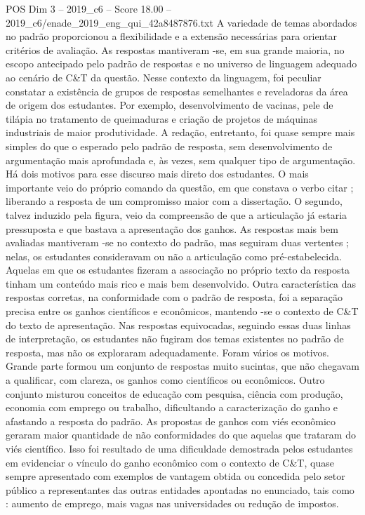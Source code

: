 \begin{textsample}{POS Dim 3 – 2019\_c6 – Score 18.00 – 2019\_c6/enade\_2019\_eng\_qui\_42a8487876.txt}
A variedade de temas abordados no padrão proporcionou a flexibilidade e a extensão necessárias para orientar critérios de avaliação.
As respostas mantiveram -se, em sua grande maioria, no escopo antecipado pelo padrão de respostas e no universo de linguagem adequado ao cenário de C\&T da questão.
Nesse contexto da linguagem, foi peculiar constatar a existência de grupos de respostas semelhantes e reveladoras da área de origem dos estudantes.
Por exemplo, desenvolvimento de vacinas, pele de tilápia no tratamento de queimaduras e criação de projetos de máquinas industriais de maior produtividade.
A redação, entretanto, foi quase sempre mais simples do que o esperado pelo padrão de resposta, sem desenvolvimento de argumentação mais aprofundada e, às vezes, sem qualquer tipo de argumentação.
Há dois motivos para esse discurso mais direto dos estudantes.
O mais importante veio do próprio comando da questão, em que constava o verbo citar ; liberando a resposta de um compromisso maior com a dissertação.
O segundo, talvez induzido pela figura, veio da compreensão de que a articulação já estaria pressuposta e que bastava a apresentação dos ganhos.
As respostas mais bem avaliadas mantiveram -se no contexto do padrão, mas seguiram duas vertentes ; nelas, os estudantes consideravam ou não a articulação como pré-estabelecida.
Aquelas em que os estudantes fizeram a associação no próprio texto da resposta tinham um conteúdo mais rico e mais bem desenvolvido.
Outra característica das respostas corretas, na conformidade com o padrão de resposta, foi a separação precisa entre os ganhos científicos e econômicos, mantendo -se o contexto de C\&T do texto de apresentação.
Nas respostas equivocadas, seguindo essas duas linhas de interpretação, os estudantes não fugiram dos temas existentes no padrão de resposta, mas não os exploraram adequadamente.
Foram vários os motivos.
Grande parte formou um conjunto de respostas muito sucintas, que não chegavam a qualificar, com clareza, os ganhos como científicos ou econômicos.
Outro conjunto misturou conceitos de educação com pesquisa, ciência com produção, economia com emprego ou trabalho, dificultando a caracterização do ganho e afastando a resposta do padrão.
As propostas de ganhos com viés econômico geraram maior quantidade de não conformidades do que aquelas que trataram do viés científico.
Isso foi resultado de uma dificuldade demostrada pelos estudantes em evidenciar o vínculo do ganho econômico com o contexto de C\&T, quase sempre apresentado com exemplos de vantagem obtida ou concedida pelo setor público a representantes das outras entidades apontadas no enunciado, tais como : aumento de emprego, mais vagas nas universidades ou redução de impostos.

\end{textsample}

